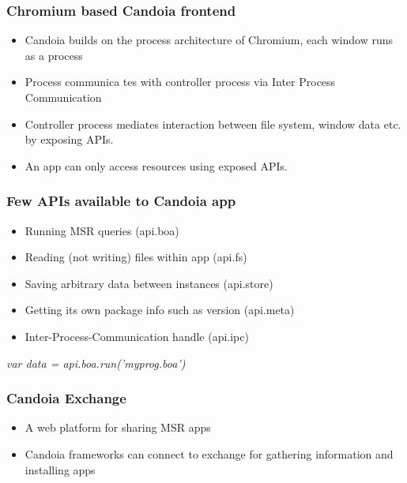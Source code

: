         \begin{frame}
            \frametitle{Chromium based Candoia frontend}
            \begin{itemize}
                \item Candoia builds on the process architecture of Chromium, each window runs as a process
                \item Process communica tes with controller process via Inter Process Communication
                \item Controller process mediates interaction between file system, window data etc. by exposing APIs.
                \item An app can only access resources using exposed APIs.
            \end{itemize}
         \end{frame}

        \begin{frame}
            \frametitle{Few APIs available to Candoia app}
            \begin{itemize}
                \item Running MSR queries (api.boa)
                \item Reading (not writing) files within app (api.fs)
                \item Saving arbitrary data between instances (api.store)
                \item Getting its own package info such as version (api.meta)
                \item Inter-Process-Communication handle (api.ipc)
            \end{itemize}
            \centering
                \emph{var data = api.boa.run('myprog.boa')}
         \end{frame}

        \begin{frame}
            \frametitle{Candoia Exchange}
            \begin{itemize}
                \item A web platform for sharing MSR apps
                \item Candoia frameworks can connect to exchange for gathering information and  installing apps
            \end{itemize}
         \end{frame}